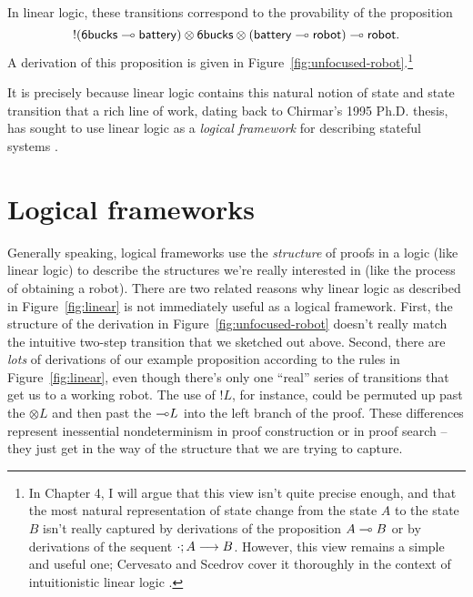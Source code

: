 In linear logic, these transitions correspond to the provability
of the proposition
\[{!}({\sf 6bucks} \multimap {\sf battery}) \otimes {\sf 6bucks} \otimes
({\sf battery} \multimap {\sf robot}) \multimap {\sf robot}.\] 
A derivation of this proposition is given in
Figure~\ref{fig:unfocused-robot}.\footnote{In Chapter 4, I will
  argue that this view isn't quite precise enough, and that the most
  natural representation of state change from the state $A$ to the
  state $B$ isn't really captured by derivations of the proposition $A
  \multimap B$ or by derivations of the sequent
  ${\cdot};{A} \longrightarrow {B} \mathstrut$.  However, this view remains a simple and useful
  one; Cervesato and Scedrov cover it thoroughly in the context of
  intuitionistic linear logic \cite{cervesato09relating}.}  



It is precisely because linear logic contains this natural notion of
state and state transition that a rich line of work, dating back to
Chirmar's 1995 Ph.D. thesis, has sought to use linear logic as a {\it
  logical framework} for describing stateful systems
\cite{chirimar95proof,cervesato02linear,
  cervesato02concurrent,pfenning04substructural,miller09formalizing,
  pfenning09substructural,cervesato09relating}.  

\section{Logical frameworks}
\label{sec:linlogicalframeworks}

Generally speaking, logical frameworks use the {\it structure} of
proofs in a logic (like linear logic) to describe the structures we're
really interested in (like the process of obtaining a robot).  There
are two related reasons why linear logic as described in
Figure~\ref{fig:linear} is not immediately useful as a logical
framework. First, the structure of the derivation in
Figure~\ref{fig:unfocused-robot} doesn't really match the intuitive
two-step transition that we sketched out above. Second, there are {\it
  lots} of derivations of our example proposition according to the
rules in Figure~\ref{fig:linear}, even though there's only one
``real'' series of transitions that get us to a working robot. The use
of ${!}L$, for instance, could be permuted up past the ${\otimes}L$
and then past the ${\multimap}L$ into the left branch of the proof. These
differences represent inessential nondeterminism in proof construction
or in proof search -- they just get in the way of the structure that
we are trying to capture. 

